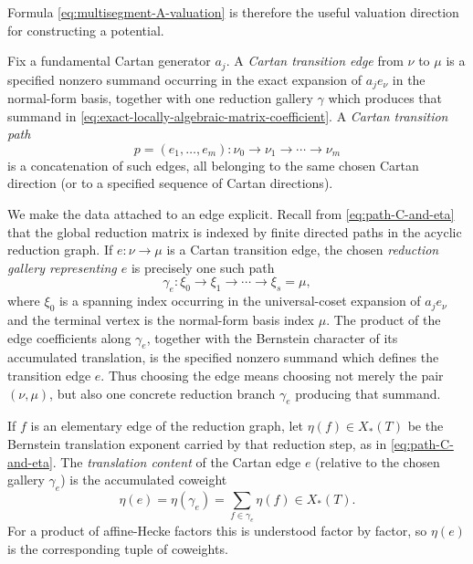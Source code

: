 \documentclass[12pt]{article}
\theoremstyle{definition}
\theoremstyle{remark}
\begin{document}
Formula \eqref{eq:multisegment-A-valuation} is therefore the useful
valuation direction for constructing a potential.

Fix a fundamental Cartan generator $a_j$.  A \emph{Cartan transition
edge} from $\nu$ to $\mu$ is a specified nonzero summand occurring in the
exact expansion of $a_je_\nu$ in the normal-form basis, together with one
reduction gallery $\gamma$ which produces that summand in
\eqref{eq:exact-locally-algebraic-matrix-coefficient}.  A \emph{Cartan
transition path}
\[
 p=(e_1,\ldots,e_m):\nu_0\to\nu_1\to\cdots\to\nu_m
\]
is a concatenation of such edges, all belonging to the same chosen Cartan
direction (or to a specified sequence of Cartan directions).

We make the data attached to an edge explicit.  Recall from
\eqref{eq:path-C-and-eta} that the global reduction matrix is indexed by
finite directed paths in the acyclic reduction graph.  If
$e:\nu\to\mu$ is a Cartan transition edge, the chosen \emph{reduction
gallery representing $e$} is precisely one such path
\begin{equation}\label{eq:edge-reduction-gallery-definition}
 \gamma_e:\xi_0\longrightarrow\xi_1\longrightarrow\cdots
 \longrightarrow\xi_s=\mu,
\end{equation}
where $\xi_0$ is a spanning index occurring in the universal-coset expansion
of $a_je_\nu$ and the terminal vertex is the normal-form basis index $\mu$.
The product of the edge coefficients along $\gamma_e$, together with the
Bernstein character of its accumulated translation, is the specified nonzero
summand which defines the transition edge $e$.  Thus choosing the edge means
choosing not merely the pair $(\nu,\mu)$, but also one concrete reduction
branch $\gamma_e$ producing that summand.

If $f$ is an elementary edge of the reduction graph, let $\eta(f)\in X_*(T)$
be the Bernstein translation exponent carried by that reduction step, as in
\eqref{eq:path-C-and-eta}.  The \emph{translation content} of the Cartan edge
$e$ (relative to the chosen gallery $\gamma_e$) is the accumulated coweight
\begin{equation}\label{eq:edge-translation-content-definition}
 \eta(e)=\eta(\gamma_e)
 =\sum_{f\in\gamma_e}\eta(f)\in X_*(T).
\end{equation}
For a product of affine-Hecke factors this is understood factor by factor, so
$\eta(e)$ is the corresponding tuple of coweights.
\end{document}
